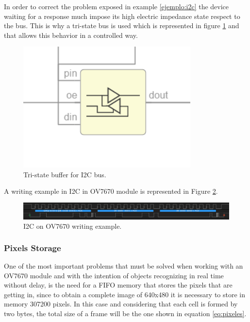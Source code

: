 In order to correct the problem exposed in example \ref{ejemplo:i2c} the device waiting for a response much impose its high electric impedance state respect to the bus. This is why a tri-state bus is used which is represented in figure \ref{fig:buffer_triestado} and that allows this behavior in a controlled way.
\begin{figure}[H]
	\center
	\includegraphics[scale=0.6, angle=0]{imagenes/Cuadricoptero_vision/triestado}
	\caption{Tri-state buffer for I2C bus.}
	\label{fig:buffer_triestado}
\end{figure}

A writing example in I2C in OV7670 module is represented in Figure \ref{fig:i2c_example}.

\begin{figure}[H]
	\center
	\includegraphics[scale=0.4, angle=0]{imagenes/Cuadricoptero_vision/i2c_example}
	\caption{I2C on OV7670 writing example.}
	\label{fig:i2c_example}
\end{figure}

\subsubsection{Pixels Storage}

One of the most important problems that must be solved when working with an OV7670 module and with the intention of objects recognizing in real time without delay, is the need for a FIFO memory that stores the pixels that are getting in, since to obtain a complete image of 640x480 it is necessary to store in memory 307200 pixels. In this case and considering that each cell is formed by two bytes, the total size of a frame will be the one shown in equation \ref{eq:pixeles}.

